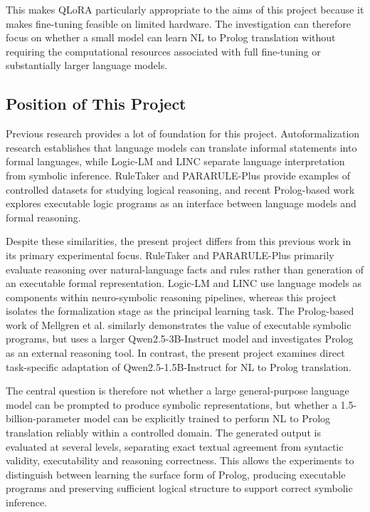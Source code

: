 \documentclass[11pt]{article} %
\theoremstyle{plain}
\theoremstyle{definition}
\begin{document}
This makes QLoRA particularly appropriate to the aims of this project because
it makes fine-tuning feasible on limited hardware. The investigation can
therefore focus on whether a small model can learn NL to Prolog translation
without requiring the computational resources associated with full fine-tuning
or substantially larger language models.


\subsection{Position of This Project}

Previous research provides a lot of foundation for this project. Autoformalization
research establishes that language models can translate informal statements
into formal languages, while Logic-LM and LINC separate language interpretation
from symbolic inference. RuleTaker and PARARULE-Plus provide examples of
controlled datasets for studying logical reasoning, and recent Prolog-based work
explores executable logic programs as an interface between language models
and formal reasoning.

Despite these similarities, the present project differs from this previous work
in its primary experimental focus. RuleTaker and PARARULE-Plus primarily
evaluate reasoning over natural-language facts and rules rather than
generation of an executable formal representation. Logic-LM and LINC use
language models as components within neuro-symbolic reasoning pipelines,
whereas this project isolates the formalization stage as the principal learning
task. The Prolog-based work of Mellgren et al. similarly demonstrates the value
of executable symbolic programs, but uses a larger Qwen2.5-3B-Instruct model
and investigates Prolog as an external reasoning tool. In contrast, the present
project examines direct task-specific adaptation of Qwen2.5-1.5B-Instruct for
NL to Prolog translation.

The central question is therefore not whether a large general-purpose language
model can be prompted to produce symbolic representations, but whether a
1.5-billion-parameter model can be explicitly trained to perform NL to Prolog
translation reliably within a controlled domain. The generated output is evaluated
at several levels, separating exact textual agreement from syntactic validity,
executability and reasoning correctness. This allows the experiments to distinguish
between learning the surface form of Prolog, producing executable programs
and preserving sufficient logical structure to support correct symbolic inference.
\end{document}
